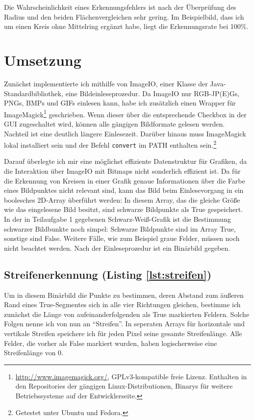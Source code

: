 Die Wahrscheinlichkeit eines Erkennungsfehlers ist nach der Überprüfung des Radius und den beiden Flächenvergleichen sehr gering. Im Beispielbild, dass ich um einen Kreis ohne Mittelring ergänzt habe, liegt die Erkennungsrate bei 100\%.

\section{Umsetzung}
Zunächst implementierte ich mithilfe von ImageIO, einer Klasse der Java-Standardbibliothek, eine Bildeinleseprozedur. Da ImageIO nur RGB-JP(E)Gs, PNGs, BMPs und GIFs einlesen kann, habe ich zusätzlich einen Wrapper für ImageMagick\footnote{\url{http://www.imagemagick.org/}, GPLv3-kompatible freie Lizenz. Enthalten in den Repositories der gängigen Linux-Distributionen, Binarys für weitere Betriebssysteme auf der Entwicklerseite.} geschrieben. 
Wenn dieser über die entsprechende Checkbox in der GUI zugeschaltet wird, können alle gängigen Bildformate gelesen werden. 
Nachteil ist eine deutlich längere Einlesezeit. Darüber hinaus muss ImageMagick lokal installiert sein und der Befehl \texttt{convert} im PATH enthalten sein.\footnote{Getestet unter Ubuntu und Fedora.} 

Darauf überlegte ich mir eine möglichst effiziente Datenstruktur für Grafiken, da die Interaktion über ImageIO mit Bitmaps nicht sonderlich effizient ist. Da für die Erkennung von Kreisen in einer Grafik genaue Informationen über die Farbe eines Bildpunktes nicht relevant sind, kann das Bild beim Einlesevorgang in ein boolesches 2D-Array überführt werden: In diesem Array, das die gleiche Größe wie das eingelesene Bild besitzt, sind schwarze Bildpunkte als True gespeichert.
In der in Teilaufgabe 1 gegebenen Schwarz-Weiß-Grafik ist die Bestimmung schwarzer Bildbunkte noch simpel: Schwarze Bildpunkte sind im Array True, sonstige sind False. Weitere Fälle, wie zum Beispiel graue Felder, müssen noch nicht beachtet werden.
Nach der Einleseprozedur ist ein Binärbild gegeben.

\subsection{Streifenerkennung (Listing \ref{lst:streifen})}
Um in diesem Binärbild die Punkte zu bestimmen, deren Abstand zum äußeren Rand eines True-Segmentes sich in alle vier Richtungen gleichen, bestimme ich zunächst die Länge von aufeinanderfolgenden als True markierten Feldern. Solche Folgen nenne ich von nun an "`Streifen"'. In seperaten Arrays für horizontale und vertikale Streifen speichere ich für jeden Pixel seine gesamte Streifenlänge.
Alle Felder, die vorher als False markiert wurden, haben logischerweise eine Streifenlänge von 0. 

